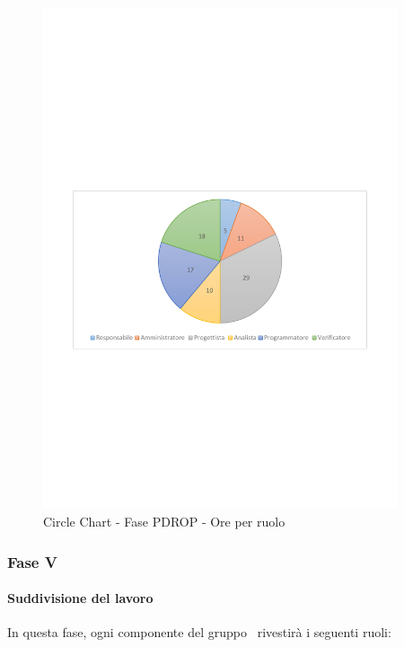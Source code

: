 \documentclass[../PianoProgetto.tex]{subfiles}
\begin{document}
	\begin{figure}[!h]
		\centering
		\includegraphics[width=0.93\textwidth , trim=2cm 9.5cm 2cm 11cm]{grafici/PDROP/PDROP-ore-ruolo}
			\caption{Circle Chart - Fase PDROP - Ore per ruolo}
		\label{fig:CircleChart-fasePDRD_ore_r}
	\end{figure}
\vfill	
\newpage
	
	\subsubsection{Fase V}
				\paragraph{Suddivisione del lavoro}
					In questa fase, ogni componente del gruppo \leaf\ rivestirà i seguenti ruoli:
	
\end{document}
